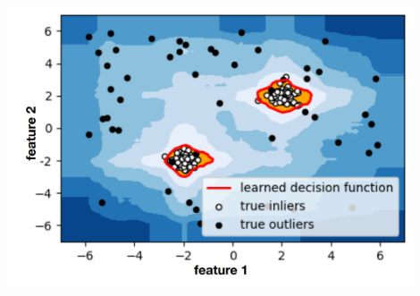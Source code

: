 \documentclass[20pt,landscape,footrule,headrule]{foils}
\begin{document}
\newpage
\begin{center}
\includegraphics[width=0.9\textwidth]{Images/IsoForest2.png}
\end{center}
\end{document}
